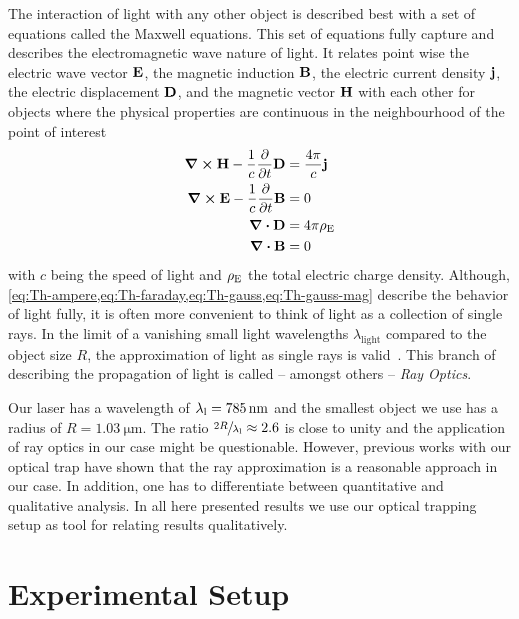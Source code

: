 The interaction of light with any other object is described best with a set of 
equations called the Maxwell equations. This set of equations fully capture and 
describes the electromagnetic wave nature of light. It relates point wise the 
electric wave vector $\vb{E}$, the magnetic induction $\vb{B}$, the electric 
current density $\vb{j}$, the electric displacement $\vb{D}$, and the magnetic 
vector $\vb{H}$ with each other for objects where the physical properties are 
continuous in the neighbourhood of the point of interest~\cite{Born1980Ch1}
\begin{subequations}
  \begin{align}
    \curl{\vb{H}} - \frac{1}{c}\pdv{t}\vb{D} &=\frac{4\pi}{c}\vb{j} 
    \label{eq:Th-ampere} \\
    \curl{\vb{E}} - \frac{1}{c}\pdv{t}\vb{B} &=  0
    \label{eq:Th-faraday} \\
    \div{\vb{D}} &= 4\pi\rho_{\mathrm{E}}
    \label{eq:Th-gauss} \\
    \div{\vb{B}} &= 0
    \label{eq:Th-gauss-mag}
  \end{align}
\end{subequations}
with $c$ being the speed of light and $\rho_{\mathrm{E}}$ the total electric charge 
density. Although, 
\cref{eq:Th-ampere,eq:Th-faraday,eq:Th-gauss,eq:Th-gauss-mag} describe the 
behavior of light fully, it is often more convenient to think of light as a 
collection of single rays. In the limit of a vanishing small light wavelengths 
$\lambda_{\text{light}}$ compared to the object size $R$, the approximation of 
light as single rays is valid~\cite{Born1980Ch3}. This branch of describing the 
propagation of light is called -- amongst others -- \emph{Ray Optics}.

Our laser has a wavelength of $\lal=\SI{785}{\nm}$ and the smallest object we 
use has a radius of $R=\SI{1.03}{\um}$. The ratio $\sfrac{2R}{\lambda_{\mathrm{l}}}\approx 2.6$ 
is close to unity and the application of ray optics in our case might be 
questionable. However, previous works with our optical trap
\cite{Lakaemper2015,Lamprecht2016,Lamprecht2017} have shown that the ray 
approximation is a reasonable approach in our case. In addition, one has to 
differentiate between quantitative and qualitative analysis. In all here 
presented results we use our optical trapping setup as tool for relating 
results qualitatively.

\section{Experimental Setup}

